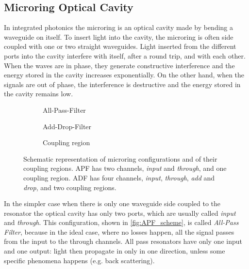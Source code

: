 \subsection{Microring Optical Cavity}
\label{ssec:Microring_Optical_Cavity}
In integrated photonics the microring is an optical cavity made by bending a waveguide on itself.
To insert light into the cavity, the microring is often side coupled with one or two straight waveguides.
Light inserted from the different ports into the cavity interfere with itself, after a round trip, and with each other.
When the waves are in phase, they generate constructive interference and the energy stored in the cavity increases exponentially.
On the other hand, when the signals are out of phase, the interference is destructive and the energy stored in the cavity remains low.


\begin{figure}[ht]
	\centering
	\begin{subfigure}[b]{0.3\textwidth}
		\centering
		
		\caption{All-Pass-Filter}
		\label{fig:APF_scheme}
	\end{subfigure}
	\hspace{.02\textwidth}
	\begin{subfigure}[b]{0.3\textwidth}
		\centering
		
		\caption{Add-Drop-Filter}
		\label{fig:ADF_scheme}
	\end{subfigure}
	\hspace{.02\textwidth}
	\begin{subfigure}[b]{0.3\textwidth}
		\centering
		
		\caption{Coupling region}
		\label{fig:coupling_scheme}
	\end{subfigure}
	
	\caption{
		Schematic representation of microring configurations and of their coupling regions.
		APF has two channels, \textit{input} and \textit{through}, and one coupling region.
		ADF has four channels, \textit{input}, \textit{through}, \textit{add} and \textit{drop}, and two coupling regions.
	}
	\label{fig:resonator_theory}
\end{figure}

In the simpler case when there is only one waveguide side coupled to the resonator the optical cavity has only two ports, which are usually called \textit{input} and \textit{through}.
This configuration, shown in \autoref{fig:APF_scheme}, is called \textit{All-Pass Filter}, because in the ideal case, where no losses happen, all the signal passes from the input to the through channels.
All pass resonators have only one input and one output: light then propagate in only in one direction, unless some specific phenomena happens (e.g. back scattering).


